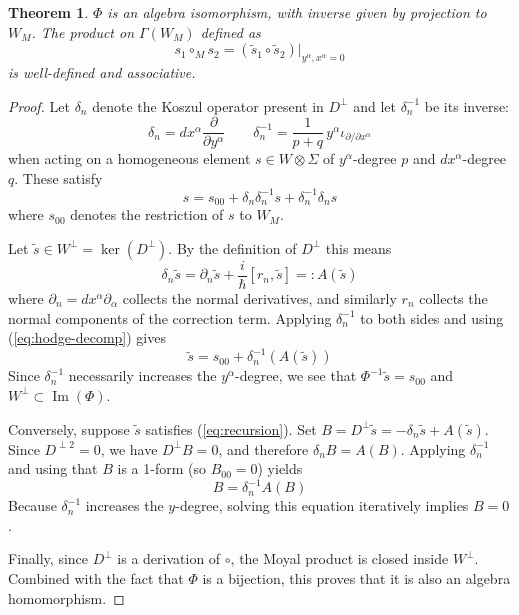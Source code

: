 \documentclass[
  12pt,
  a4paper, oneside
]{report}
\renewcommand{\hbar}{\hslash}
\theoremstyle{bolddef}
\newtheorem{theorem}{Theorem}[chapter]
\theoremstyle{remark}
\numberwithin{equation}{chapter}
\begin{document}
\begin{theorem}\label{thm:Phi-iso}
$\Phi$ is an algebra isomorphism, with inverse given by projection to $W_M$. The product on $\Gamma(W_M)$ defined as
\[
s_1 \circ_M s_2 = (\tilde{s}_1 \circ \tilde{s}_2)\big|_{y^\alpha, x^\alpha = 0}
\]
is well-defined and associative.
\end{theorem}
\begin{proof}
Let $\delta_n$ denote the Koszul operator present in $D^\perp$ and let $\delta_n^{-1}$ be its inverse:
\[
\delta_n = dx^\alpha \frac{\partial}{\partial y^\alpha} \qquad \delta_n^{-1} = \frac{1}{p+q}\, y^\alpha \iota_{\partial/\partial x^\alpha}
\]
when acting on a homogeneous element $s \in W \otimes \Sigma$ of $y^\alpha$-degree $p$ and $dx^\alpha$-degree $q$. These satisfy
\begin{equation}\label{eq:hodge-decomp}
s = s_{00} + \delta_n \delta_n^{-1} s + \delta_n^{-1} \delta_n s
\end{equation}
where $s_{00}$ denotes the restriction of $s$ to $W_M$.

Let $\tilde{s} \in W^\perp = \ker(D^\perp)$. By the definition of $D^\perp$ this means
\[
\delta_n \tilde{s} = \partial_n \tilde{s} + \frac{i}{\hbar}[r_n, \tilde{s}] =: A(\tilde{s})
\]
where $\partial_n = dx^\alpha \partial_\alpha$ collects the normal derivatives, and similarly $r_n$ collects the normal components of the correction term. Applying $\delta_n^{-1}$ to both sides and using (\ref{eq:hodge-decomp}) gives
\begin{equation}\label{eq:recursion}
\tilde{s} = s_{00} + \delta_n^{-1}(A(\tilde{s}))
\end{equation}
Since $\delta_n^{-1}$ necessarily increases the $y^\alpha$-degree, we see that $\Phi^{-1}\tilde{s} = s_{00}$ and $W^\perp \subset \operatorname{Im}(\Phi)$.

Conversely, suppose $\tilde{s}$ satisfies (\ref{eq:recursion}). Set $B = D^\perp \tilde{s} = -\delta_n \tilde{s} + A(\tilde{s})$. Since $D^{\perp 2} = 0$, we have $D^\perp B = 0$, and therefore $\delta_n B = A(B)$. Applying $\delta_n^{-1}$ and using that $B$ is a 1-form (so $B_{00} = 0$) yields
\[
B = \delta_n^{-1} A(B)
\]
Because $\delta_n^{-1}$ increases the $y$-degree, solving this equation iteratively implies $B = 0$.

Finally, since $D^\perp$ is a derivation of $\circ$, the Moyal product is closed inside $W^\perp$. Combined with the fact that $\Phi$ is a bijection, this proves that it is also an algebra homomorphism.
\end{proof}
\end{document}
